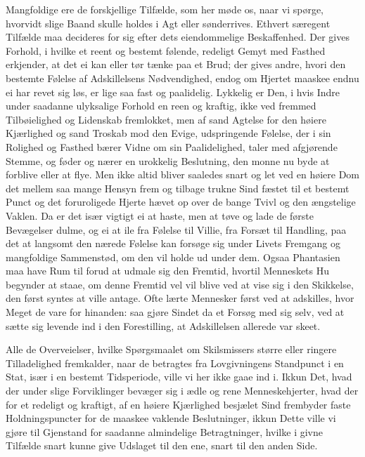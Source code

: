 \documentclass[12pt,a4paper]{book}
\newcommand{\apage}[1]{\marginnote{\footnotesize\textit{[#1]}}}
\begin{document}
Mangfoldige ere de forskjellige Tilfælde, som her møde os, naar vi
spørge, hvorvidt slige Baand skulle holdes i Agt eller sønderrives.
Ethvert særegent Tilfælde maa decideres for sig efter dets eiendommelige
Beskaffenhed. Der gives Forhold, i hvilke et reent og bestemt følende,
redeligt Gemyt med Fasthed erkjender, at det ei kan eller tør tænke paa
et Brud; der gives andre, hvori den bestemte Følelse af Adskillelsens
Nødvendighed, endog om Hjertet maaskee endnu ei har revet \apage{134} sig løs, er
lige saa fast og paalidelig. Lykkelig er Den, i hvis Indre under
saadanne ulyksalige Forhold en reen og kraftig, ikke ved fremmed
Tilbøielighed og Lidenskab fremlokket, men af sand Agtelse for den
høiere Kjærlighed og sand Troskab mod den Evige, udspringende Følelse,
der i sin Rolighed og Fasthed bærer Vidne om sin Paalidelighed, taler
med afgjørende Stemme, og føder og nærer en urokkelig Beslutning, den
monne nu byde at forblive eller at flye. Men ikke altid bliver saaledes
snart og let ved en høiere Dom det mellem saa mange Hensyn frem og
tilbage trukne Sind fæstet til et bestemt Punct og det foruroligede
Hjerte hævet op over de bange Tvivl og den ængstelige Vaklen. Da er det
især vigtigt ei at haste, men at tøve og lade de første Bevægelser
dulme, og ei at ile fra Følelse til Villie, fra Forsæt til Handling, paa
det at langsomt den nærede Følelse kan forsøge sig under Livets Fremgang
og mangfoldige Sammenstød, om den vil holde ud under dem. Ogsaa
Phantasien maa have Rum til forud at udmale sig den Fremtid, hvortil
Menneskets Hu begynder at staae, om denne Fremtid vel vil blive ved at
vise sig i den Skikkelse, den først syntes at ville antage. Ofte lærte
Mennesker først ved at adskilles, hvor Meget de vare for hinanden: saa
gjøre Sindet da et Forsøg med sig selv, ved at sætte sig levende ind i
den Forestilling, at Adskillelsen allerede var skeet.

Alle de Overveielser, hvilke Spørgsmaalet om Skilsmissers større eller
ringere Tilladelighed fremkalder, \apage{135} naar de betragtes fra Lovgivningens
Standpunct i en Stat, især i en bestemt Tidsperiode, ville vi her ikke
gaae ind i. Ikkun Det, hvad der under slige Forviklinger bevæger sig i
ædle og rene Menneskehjerter, hvad der for et redeligt og kraftigt, af
en høiere Kjærlighed besjælet Sind frembyder faste Holdningspuncter for
de maaskee vaklende Beslutninger, ikkun Dette ville vi gjøre til
Gjenstand for saadanne almindelige Betragtninger, hvilke i givne
Tilfælde snart kunne give Udslaget til den ene, snart til den anden
Side.
\end{document}
